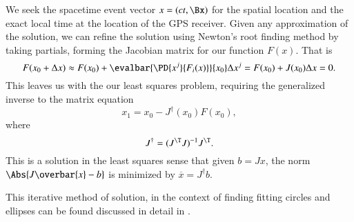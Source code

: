 We seek the spacetime event vector \(x = (c t, \Bx)\) for the spatial location and the exact local time at the location of the GPS receiver.  Given any approximation of the solution, we can refine the solution using Newton's root finding method by taking partials, forming the Jacobian matrix for our function \(F(x)\).  That is
\begin{equation}\label{eqn:relativisticElectrodynamicsA1:320}
F(x_0 + \Delta x) \approx F(x_0) + \evalbar{\PD{x^j}{F_i(x)}}{x_0} \Delta x^j = F(x_0) + J(x_0) \Delta x = 0.
\end{equation}
This leaves us with the our least squares problem, requiring the generalized inverse to the matrix equation
\begin{equation}\label{eqn:relativisticElectrodynamicsA1:330}
x_1 = x_0 - J^\dagger (x_0) F(x_0),
\end{equation}
where
\begin{equation}\label{eqn:relativisticElectrodynamicsA1:340}
J^\dagger = (J^\T J)^{-1} J^\T.
\end{equation}
This is a solution in the least squares sense that given \(b = J x\), the norm \(\Abs{ J \overbar{x} - b}\) is minimized by \(\overbar{x} = J^\dagger b\).

This iterative method of solution, in the context of finding fitting circles and ellipses can be found discussed in detail in \citep{gander1994least}.

